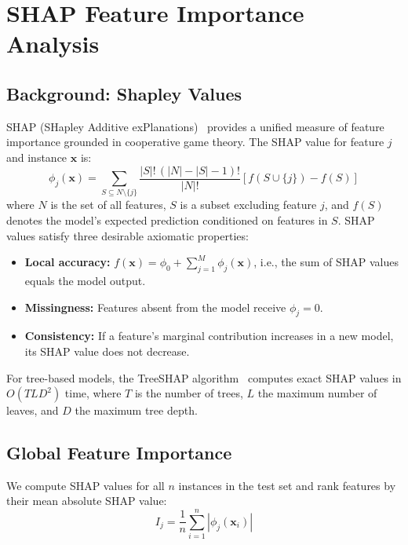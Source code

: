 \documentclass[10pt, conference, letterpaper]{IEEEtran}
\begin{document}
\section{SHAP Feature Importance Analysis}
\label{sec:shap}

\subsection{Background: Shapley Values}

SHAP (SHapley Additive exPlanations)~\cite{lundberg2017shap} provides a unified measure of feature importance grounded in cooperative game theory. The SHAP value for feature $j$ and instance $\mathbf{x}$ is:
\begin{equation}
\phi_j(\mathbf{x}) = \sum_{S \subseteq N \setminus \{j\}} \frac{|S|!\,(|N|-|S|-1)!}{|N|!} \left[ f(S \cup \{j\}) - f(S) \right]
\label{eq:shap}
\end{equation}
where $N$ is the set of all features, $S$ is a subset excluding feature $j$, and $f(S)$ denotes the model's expected prediction conditioned on features in $S$. SHAP values satisfy three desirable axiomatic properties:
\begin{itemize}
    \item \textbf{Local accuracy:} $f(\mathbf{x}) = \phi_0 + \sum_{j=1}^{M} \phi_j(\mathbf{x})$, i.e., the sum of SHAP values equals the model output.
    \item \textbf{Missingness:} Features absent from the model receive $\phi_j = 0$.
    \item \textbf{Consistency:} If a feature's marginal contribution increases in a new model, its SHAP value does not decrease.
\end{itemize}

For tree-based models, the TreeSHAP algorithm~\cite{lundberg2020treeshap} computes exact SHAP values in $O(TLD^2)$ time, where $T$ is the number of trees, $L$ the maximum number of leaves, and $D$ the maximum tree depth.

\subsection{Global Feature Importance}

We compute SHAP values for all $n$ instances in the test set and rank features by their mean absolute SHAP value:
\begin{equation}
I_j = \frac{1}{n} \sum_{i=1}^{n} |\phi_j(\mathbf{x}_i)|
\label{eq:shap_importance}
\end{equation}
\end{document}
